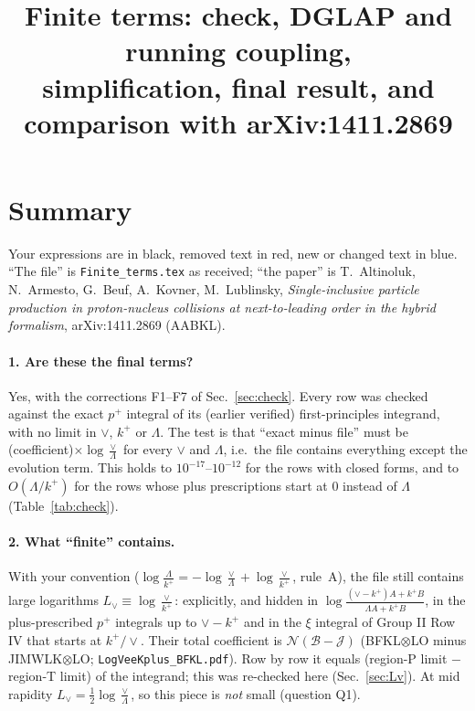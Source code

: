 \documentclass[10pt]{article}
\title{Finite terms: check, DGLAP and running coupling,\\ simplification, final result, and comparison with arXiv:1411.2869}
\date{}
\numberwithin{equation}{section}
\newcommand{\new}[1]{{\color{blue}#1}}
\newcommand{\old}[1]{{\color{red}#1}}
\newcommand{\Lv}{L_{\vee}}
\newcommand{\JJ}{\mathcal J}
\newcommand{\BB}{\mathcal B}
\newcommand{\NN}{\mathcal N}
\begin{document}
\maketitle
\tableofcontents

\section{Summary}\label{sec:summary}
Your expressions are in black, removed text in \old{red}, new or changed text in \new{blue}. ``The file'' is \texttt{Finite\_terms.tex} as received; ``the paper'' is T.~Altinoluk, N.~Armesto, G.~Beuf, A.~Kovner, M.~Lublinsky, \emph{Single-inclusive particle production in proton-nucleus collisions at next-to-leading order in the hybrid formalism}, arXiv:1411.2869 (AABKL).

\paragraph{1. Are these the final terms?} Yes, with the corrections F1--F7 of Sec.~\ref{sec:check}. Every row was checked against the exact $p^+$ integral of its (earlier verified) first-principles integrand, with no limit in $\vee$, $k^+$ or $\Lambda$. The test is that ``exact minus file'' must be (coefficient)$\times\log\frac{\vee}{\Lambda}$ for every $\vee$ and $\Lambda$, i.e.\ the file contains everything except the evolution term. This holds to $10^{-17}$--$10^{-12}$ for the rows with closed forms, and to $O(\Lambda/k^+)$ for the rows whose plus prescriptions start at $0$ instead of $\Lambda$ (Table~\ref{tab:check}).

\paragraph{2. What ``finite'' contains.} With your convention ($\log\frac{\Lambda}{k^+}=-\log\frac{\vee}{\Lambda}+\log\frac{\vee}{k^+}$, rule~A), the file still contains large logarithms $\Lv\equiv\log\frac{\vee}{k^+}$: explicitly, and hidden in $\log\frac{(\vee-k^+)A+k^+B}{\Lambda A+k^+B}$, in the plus-prescribed $p^+$ integrals up to $\vee-k^+$ and in the $\xi$ integral of Group II Row IV that starts at $k^+/\vee$. Their total coefficient is $\NN(\BB-\JJ)$ (BFKL$\otimes$LO minus JIMWLK$\otimes$LO; \texttt{LogVeeKplus\_BFKL.pdf}). Row by row it equals (region-P limit $-$ region-T limit) of the integrand; this was re-checked here (Sec.~\ref{sec:Lv}). At mid rapidity $\Lv=\frac12\log\frac{\vee}{\Lambda}$, so this piece is \emph{not} small (question Q1).
\end{document}

